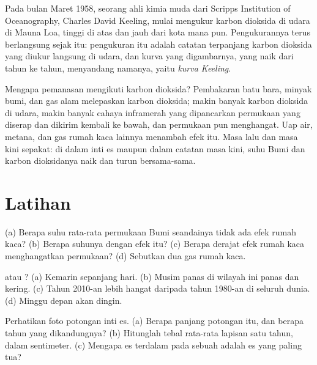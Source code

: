 \begin{history}
Pada bulan Maret 1958, seorang ahli kimia muda dari Scripps Institution of
Oceanography, Charles David Keeling, mulai mengukur karbon dioksida di
udara di Mauna Loa, tinggi di atas  dan jauh dari kota mana pun.
Pengukurannya terus berlangsung sejak itu: pengukuran itu adalah catatan
terpanjang karbon dioksida yang diukur langsung di udara, dan kurva yang
digambarnya, yang naik dari tahun ke tahun, menyandang namanya, yaitu
\emph{kurva Keeling}.
\end{history}

Mengapa pemanasan mengikuti karbon dioksida? Pembakaran batu bara, minyak
bumi, dan gas alam melepaskan karbon dioksida; makin banyak karbon
dioksida di udara, makin banyak cahaya inframerah yang dipancarkan
permukaan yang diserap dan dikirim kembali ke bawah, dan permukaan pun
menghangat. Uap air, metana, dan gas rumah kaca lainnya menambah efek
itu. Masa lalu dan masa kini sepakat: di dalam inti es maupun dalam
catatan masa kini, suhu Bumi dan karbon dioksidanya naik dan turun
bersama-sama.

\section{Latihan}

\begin{exercise}[$\star$]\label{exo:g9:climate-past-and-present:1}
(a) Berapa suhu rata-rata permukaan Bumi seandainya tidak ada efek rumah
kaca? (b) Berapa suhunya dengan efek itu? (c) Berapa derajat efek rumah
kaca menghangatkan permukaan? (d) Sebutkan dua gas rumah kaca.
\end{exercise}

\begin{exercise}[$\star$]\label{exo:g9:climate-past-and-present:2}
 atau ? (a) Kemarin  sepanjang hari. (b) Musim panas di
wilayah ini panas dan kering. (c) Tahun 2010-an lebih hangat daripada tahun
1980-an di seluruh dunia. (d) Minggu depan akan dingin.
\end{exercise}

\begin{exercise}[$\star$]\label{exo:g9:climate-past-and-present:3}
Perhatikan foto potongan inti es. (a) Berapa panjang potongan itu, dan
berapa tahun  yang dikandungnya? (b) Hitunglah tebal rata-rata
lapisan satu tahun, dalam sentimeter. (c) Mengapa es terdalam pada sebuah
 adalah es yang paling tua?
\end{exercise}

